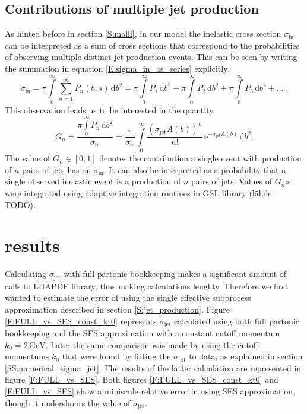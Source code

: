 \documentclass[a4paper, twoside, english, 12pt]{article}
\begin{document}
\subsection{Contributions of multiple jet production}\label{SS:multiple_jets}

As hinted before in section \ref{S:malli}, in our model the inelastic cross section $\sigma_{\text{in}}$ can be interpreted as a sum of cross sections that correspond to the probabilities of observing multiple distinct jet production events. This can be seen by writing the summation in equation \eqref{E:sigma_in_as_series} explicitly:
\begin{equation}
	\sigma_\text{in} =  \pi\int\limits_0^\infty \sum\limits_{n=1}^\infty P_n(b,s)\, \text{d}b^2 = \pi\int\limits_0^\infty P_1\, \text{d}b^2 + \pi\int\limits_0^\infty P_2\, \text{d}b^2 + \pi\int\limits_0^\infty P_3\, \text{d}b^2 +\ldots \; .
\end{equation}
This observation leads us to be interested in the quantity
\begin{equation}
	G_n = \frac{\pi\int\limits_0^\infty P_n\, \text{d}b^2}{\sigma_\text{in}} = \frac{\pi}{\sigma_\text{in}}\int\limits_0^\infty \frac{(\sigma_\text{jet}A(b))^n}{n!}\,\text{e}^{-\sigma_\text{jet}A(b)} \, \text{d}b^2.
\end{equation}
The value of $G_n\in [0,1]$ denotes the contribution a single event with production of $n$ pairs of jets has on $\sigma_\text{in}$. It can also be interpreted as a probability that a single observed inelastic event is a production of $n$ pairs of jets. Values of $G_n$:s were integrated using adaptive integration routines in GSL library (lähde TODO).


\section{results}


Calculating $\sigma_{\text{jet}}$ with full partonic bookkeeping makes a significant amount of calls to LHAPDF library, thus making calculations lenghty. Therefore we first wanted to estimate the error of using the single effective subprocess approximation described in section \ref{S:jet_production}. Figure \ref{F:FULL_vs_SES_const_kt0} represents $\sigma_{\text{jet}}$ calculated using both full partonic bookkeeping and the SES approximation with a constant cutoff momentum $k_0=2\,\text{GeV}$. Later the same comparison was made by using the cutoff momentums $k_0$ that were found by fitting the $\sigma_{\text{tot}}$ to data, as explained in section \ref{SS:numerical_sigma_jet}. The results of the latter calculation are represented in figure \ref{F:FULL_vs_SES}. Both figures \ref{F:FULL_vs_SES_const_kt0} and \ref{F:FULL_vs_SES} show a miniscule relative error in using SES approximation, though it undershoots the value of $\sigma_{\text{jet}}$. 
\end{document}
